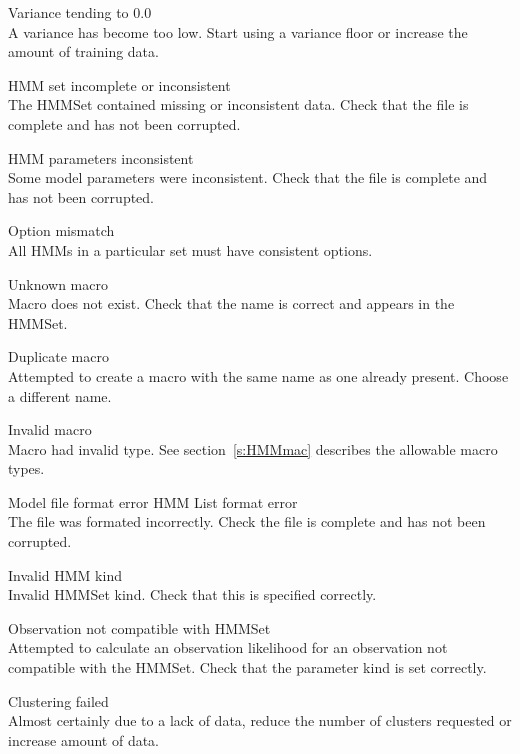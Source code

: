 \begin{itemize}
\begin{itemize}
    Variance tending to 0.0\\
        A variance has become too low.  Start using a variance floor or 
        increase the amount of training data.

    HMM set incomplete or inconsistent\\
        The HMMSet contained missing or inconsistent data.  Check that the 
        file is complete and has not been corrupted.

    HMM parameters inconsistent\\
        Some model parameters were inconsistent.  Check that the file is 
        complete and has not been corrupted.

 Option mismatch\\
        All HMMs in a particular set must have consistent options.

    Unknown macro\\
        Macro does not exist.  Check that the name is correct and appears 
        in the HMMSet.

    Duplicate macro\\
        Attempted to create a macro with the same name as one already present.
        Choose a different name.

    Invalid macro\\
        Macro had invalid type.  See section~\ref{s:HMMmac} describes the 
        allowable macro types.

    Model file format error
    HMM List format error\\
        The file was formated incorrectly.  Check the file is complete and
        has not been corrupted.

    Invalid HMM kind\\
        Invalid HMMSet kind.  Check that this is specified correctly.

    Observation not compatible with HMMSet\\
        Attempted to calculate an observation likelihood for an observation
        not compatible with the HMMSet.  Check that the parameter kind is
        set correctly.

\end{itemize}


\begin{itemize}
    Clustering failed\\
        Almost certainly due to a lack of data, reduce the
        number of clusters requested  or increase amount of data.


\end{itemize}
\end{itemize}
